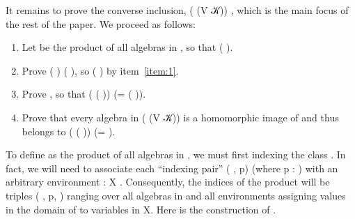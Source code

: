 It remains to prove the converse inclusion,  ( (V 𝒦))   ,
which is the main focus of the rest of the paper.  We proceed as follows:

\begin{enumerate}
\item \label{item:1} Let  be the product of all algebras in  , so that    ( ).
\item Prove  ( )   ( ), so    ( ) by item~\ref{item:1}.
\item Prove   , so that    ( ( )) (=  ( )).
\item Prove that every algebra in  ( (V 𝒦)) is a homomorphic image of
 and thus belongs to  ( ( )) (=  ).
\end{enumerate}

To define  as the product of all algebras in  , we must first indexing the class  .
In fact, we will need to associate each ``indexing pair'' ( , \ab p) (where \ab p :    ) with an arbitrary environment
 : \ab X  . Consequently, the indices of the product will be triples ( , \ab p, ) ranging over all algebras in   and all
environments assigning values in the domain of  to variables in \ab X.  Here is the construction of .

